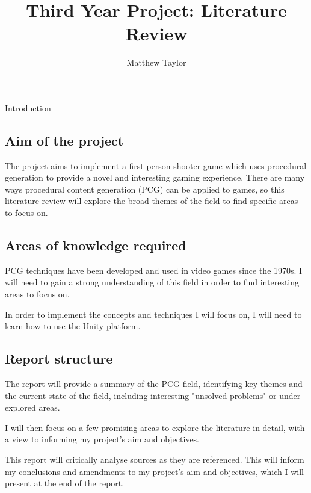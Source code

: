 \documentclass[review]{cmpreport}
\title{Third Year Project: Literature Review}
\author{Matthew Taylor}
\begin{document}
\maketitle

\begin{section}{Introduction}

\subsection{Aim of the project}
The project aims to implement a first person shooter game which uses procedural generation to provide a novel and interesting gaming experience. There are many ways procedural content generation (PCG) can be applied to games, so this literature review will explore the broad themes of the field to find specific areas to focus on.

\subsection{Areas of knowledge required}
PCG techniques have been developed and used in video games since the 1970s. I will need to gain a strong understanding of this field in order to find interesting areas to focus on.\par
In order to implement the concepts and techniques I will focus on, I will need to learn how to use the Unity platform.

\subsection{Report structure}
The report will provide a summary of the PCG field, identifying key themes and the current state of the field, including interesting "unsolved problems" or under-explored areas. \par
I will then focus on a few promising areas to explore the literature in detail, with a view to informing my project's aim and objectives. \par
This report will critically analyse sources as they are referenced. This will inform my conclusions and amendments to my project's aim and objectives, which I will present at the end of the report.

\end{section}
\end{document}
